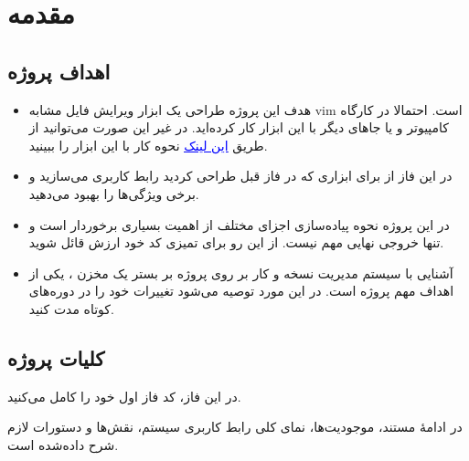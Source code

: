 \section*{{\titr مقدمه}}

\subsection*{{\titr اهداف پروژه}}


\begin{itemize}

\item
هدف این پروژه طراحی یک ابزار ویرایش فایل مشابه vim است. احتمالا در کارگاه کامپیوتر و یا جاهای دیگر با این ابزار کار کرده‌اید. در غیر این صورت می‌توانید از طریق \href{https://www.openvim.com}{\textcolor{blue}{\underline{این لینک}}} نحوه کار با این ابزار را ببینید.

\item
در این فاز از برای ابزاری که در فاز قبل طراحی کردید رابط کاربری می‌سازید و برخی ویژگی‌ها را بهبود می‌دهید.

\item
در این پروژه نحوه پیاده‌سازی اجزای مختلف از اهمیت بسیاری برخوردار است و تنها خروجی نهایی مهم نیست. از این رو برای تمیزی کد خود ارزش قائل شوید. 

\item
آشنایی با سیستم مدیریت نسخه  و کار بر روی پروژه بر بستر یک مخزن ، یکی از اهداف مهم پروژه است. در این مورد توصیه می‌شود تغییرات خود را در دوره‌های کوتاه مدت  کنید.

\end{itemize}

\subsection*{{\titr کلیات پروژه}}

در این فاز، کد فاز اول خود را کامل می‌کنید.

در ادامهٔ مستند، موجودیت‌ها، نمای کلی رابط کاربری سیستم، نقش‌ها و دستورات لازم شرح داده‌شده است.

